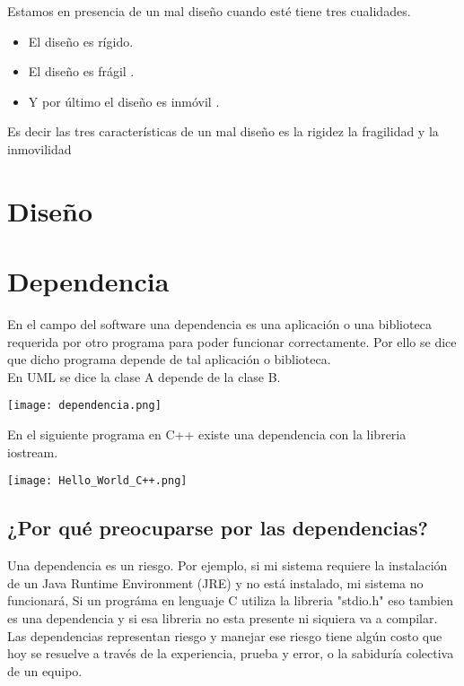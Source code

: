 \documentclass[12pt]{book}
\begin{document}
Estamos en presencia de un mal diseño cuando esté tiene tres cualidades.
\begin{itemize}
 \item El diseño es rígido.
 \item El diseño es frágil .
 \item Y por último el diseño es inmóvil .
 \end{itemize} Es decir las tres características de un mal diseño es la rigidez la fragilidad y la inmovilidad

\section{Diseño}



\section{Dependencia} En el campo del software una dependencia es una aplicación o una biblioteca requerida por otro programa para poder funcionar correctamente. Por ello se dice que dicho programa depende de tal aplicación o biblioteca.
\\
En UML se dice la clase A depende de la clase B.
\\
\begin{center}
\texttt{[image: dependencia.png]}
\end{center}
En el siguiente programa en C++ existe una dependencia con la libreria iostream.\\
\begin{center}
\texttt{[image: Hello\_World\_C++.png]}
\end{center}

\subsection{¿Por qué preocuparse por las dependencias?}
Una dependencia es un riesgo. Por ejemplo, si mi sistema requiere la instalación de un Java Runtime Environment (JRE) y no está instalado, mi sistema no funcionará, Si un progr\'ama en lenguaje C utiliza la libreria "stdio.h" eso tambien es una dependencia y si esa libreria no esta presente ni siquiera va a compilar.
\\
Las dependencias representan riesgo y manejar ese riesgo tiene algún costo que hoy se resuelve a través de la experiencia, prueba y error, o la sabiduría colectiva de un equipo.
\end{document}
